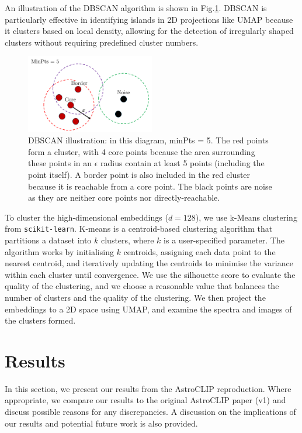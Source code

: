 \documentclass[a4paper,12pt]{article}
\begin{document}
An illustration of the DBSCAN algorithm is shown in Fig.\ref{fig:dbscan}. DBSCAN is particularly effective in identifying islands in 2D projections like UMAP because it clusters based on local density, allowing for the detection of irregularly shaped clusters without requiring predefined cluster numbers. 

\begin{figure}[H]
    \centering
    \includegraphics[width=0.5\textwidth]{../figures/dbscan_diagram.png}
    \caption{DBSCAN illustration: in this diagram, minPts = 5. 
    The red points form a cluster, with 4 core points because the area surrounding these points in an $\epsilon$ radius contain at least 5 points (including the point itself). A border point is also included in the red cluster because it is reachable from a core point. The black points are noise as they are neither core points nor directly-reachable.}
    \label{fig:dbscan}
\end{figure}

To cluster the high-dimensional embeddings ($d = 128$), we use k-Means \cite{udl} clustering from \verb|scikit-learn|. K-means is a centroid-based clustering algorithm that partitions a dataset into \( k \) clusters, where \( k \) is a user-specified parameter. The algorithm works by initialising \( k \) centroids, assigning each data point to the nearest centroid, and iteratively updating the centroids to minimise the variance within each cluster until convergence. We use the silhouette score \cite{silhouette} to evaluate the quality of the clustering, and we choose a reasonable value that balances the number of clusters and the quality of the clustering. We then project the embeddings to a 2D space using UMAP, and examine the spectra and images of the clusters formed.






\section{Results}
In this section, we present our results from the AstroCLIP reproduction. Where appropriate, we compare our results to the original AstroCLIP paper (v1) \cite{astroclip} and discuss possible reasons for any discrepancies. A discussion on the implications of our results and potential future work is also provided.
\end{document}
